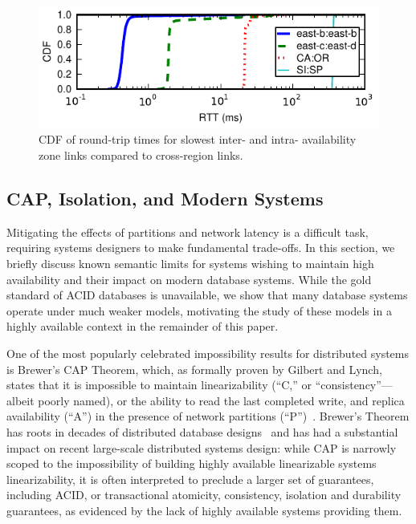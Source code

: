 \begin{figure}
\includegraphics[width=\columnwidth]{graphs/ping-plot.pdf}
\caption{CDF of round-trip times for slowest inter- and intra-
  availability zone links compared to cross-region links.}
\label{fig:rtt}
\end{figure}


\subsection{CAP, Isolation, and Modern Systems}
\label{sec:modernacid}

Mitigating the effects of partitions and network latency is a
difficult task, requiring systems designers to make fundamental
trade-offs. In this section, we briefly discuss known semantic limits
for systems wishing to maintain high availability and their impact on
modern database systems. While the gold standard of ACID databases is
unavailable, we show that many database systems operate under much
weaker models, motivating the study of these models in a highly
available context in the remainder of this paper.

One of the most popularly celebrated impossibility results for
distributed systems is Brewer's CAP Theorem, which, as formally proven
by Gilbert and Lynch, states that it is impossible to maintain
linearizability (``C,'' or ``consistency''---albeit poorly named), or
the ability to read the last completed write, and replica availability
(``A'') in the presence of network partitions
(``P'')~\cite{gilbert-cap}. Brewer's Theorem has roots in decades of
distributed database designs~\cite{davidson-survey} and has had a
substantial impact on recent large-scale distributed systems design:
while CAP is narrowly scoped to the impossibility of building highly
available linearizable systems linearizability, it is often
interpreted to preclude a larger set of guarantees, including ACID, or
transactional atomicity, consistency, isolation and durability
guarantees, as evidenced by the lack of highly available systems
providing them.

